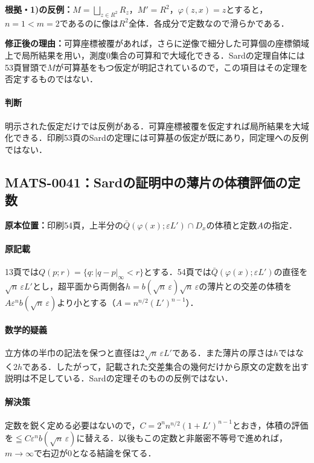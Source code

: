 \documentclass[a4paper,10pt]{ltjsarticle}
\begin{document}
\textbf{根拠・1)の反例：}$M=\bigsqcup_{z\in R^2}R_z$，$M'=R^2$，$\varphi(z,x)=z$とすると，$n=1<m=2$であるのに像は$R^2$全体．各成分で定数なので滑らかである．

\textbf{修正後の理由：}可算座標被覆があれば，さらに逆像で細分した可算個の座標領域上で局所結果を用い，測度0集合の可算和で大域化できる．Sardの定理自体には53頁冒頭で$M$が可算基をもつ仮定が明記されているので，この項目はその定理を否定するものではない．

\paragraph{判断}明示された仮定だけでは反例がある．可算座標被覆を仮定すれば局所結果を大域化できる．印刷53頁のSardの定理には可算基の仮定が既にあり，同定理への反例ではない．


\subsection*{MATS-0041：Sardの証明中の薄片の体積評価の定数}\label{math:MATS-0041}
\noindent\textbf{原本位置：}印刷54頁，上半分の$\bar Q(\varphi(x);\varepsilon L')\cap D_x$の体積と定数$A$の指定．

\paragraph{原記載}13頁では$Q(p;r)=\{q:|q-p|_\infty<r\}$とする．54頁では$\bar Q(\varphi(x);\varepsilon L\prime)$の直径を$\sqrt n\,\varepsilon L\prime$とし，超平面から両側各$h=b(\sqrt n\,\varepsilon)\sqrt n\,\varepsilon$の薄片との交差の体積を$A\varepsilon^nb(\sqrt n\,\varepsilon)$より小とする（$A=n^{n/2}(L\prime)^{n-1}$）．

\paragraph{数学的疑義}立方体の半巾の記法を保つと直径は$2\sqrt n\,\varepsilon L\prime$である．また薄片の厚さは$h$ではなく$2h$である．したがって，記載された交差集合の幾何だけから原文の定数を出す説明は不足している．Sardの定理そのものの反例ではない．

\paragraph{解決策}定数を鋭く定める必要はないので，$C=2^n n^{n/2}(1+L\prime)^{n-1}$とおき，体積の評価を$\leqq C\varepsilon^nb(\sqrt n\,\varepsilon)$に替える．以後もこの定数と非厳密不等号で進めれば，$m\to\infty$で右辺が0となる結論を保てる．
\end{document}
